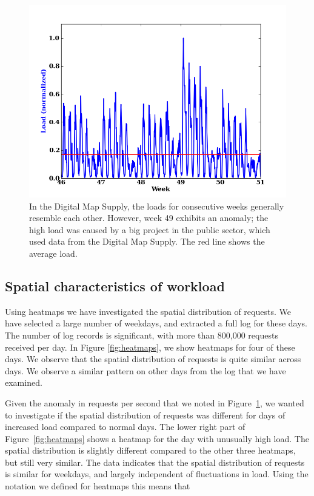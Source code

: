 \documentclass[11pt, oneside]{report}
\begin{document}
{\begin{figure}
\centering
\includegraphics[scale=0.5]{figs-tileheat/anomaly.png}
\caption{In the Digital Map Supply, the loads for consecutive weeks generally resemble each other. However, week 49 exhibits an anomaly; the high load was caused by a big project in the public sector, which used data from the Digital Map Supply. The red line shows the average load.}
\label{fig:anomaly}
\end{figure}

\subsection{Spatial characteristics of workload}
\label{sec:spatial:characteristics}
Using heatmaps we have investigated the spatial distribution of requests. We have selected a large number of weekdays, and extracted a full log for these days. The number of log records is significant, with more than 800,000 requests received per day. In Figure \ref{fig:heatmaps}, we show heatmaps for four of these days. We observe that the spatial distribution of requests is quite similar across days. We observe a similar pattern on other days from the log that we have examined.

Given the anomaly in requests per second that we noted in Figure~\ref{fig:anomaly}, we wanted to investigate if the spatial distribution of requests was different for days of increased load compared to normal days. The lower right part of Figure~\ref{fig:heatmaps} shows a heatmap for the day with unusually high load. The spatial distribution is slightly different compared to the other three heatmaps, but still very similar. The data indicates that the spatial distribution of requests is similar for weekdays, and largely independent of fluctuations in load. Using the notation we defined for heatmaps this means that

}
\end{document}
